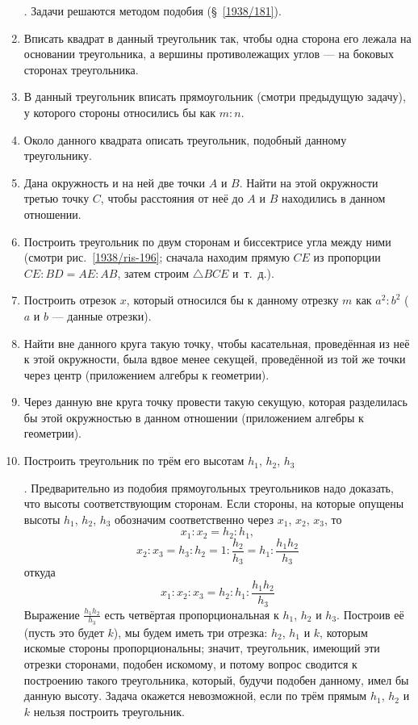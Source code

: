 \documentclass[oneside]{book}
\begin{document}
\begin{enumerate}[resume]
\smallskip
{}.
Задачи решаются методом подобия (§~\ref{1938/181}).

 \item
Вписать квадрат в данный треугольник так, чтобы одна сторона его лежала на основании треугольника, а вершины противолежащих углов — на боковых сторонах треугольника.

 \item
В данный треугольник вписать прямоугольник (смотри предыдущую задачу), у которого стороны относились бы как $m:n$.

 \item
Около данного квадрата описать треугольник, подобный данному треугольнику.

 \item
Дана окружность и на ней две точки $A$ и $B$.
Найти на этой окружности третью точку $C$, чтобы расстояния от неё до $A$ и $B$ находились в данном отношении.

 \item
Построить треугольник по двум сторонам и биссектрисе угла между ними (смотри рис.~\ref{1938/ris-196};
сначала находим прямую $CE$ из пропорции $CE:BD=AE:AB$, затем строим $\triangle BCE$ и~т.~д.).

 \item
Построить отрезок $x$, который относился бы к данному отрезку $m$ как $a^2:b^2$ ($a$ и $b$ — данные отрезки).

 \item
Найти вне данного круга такую точку, чтобы касательная, проведённая из неё к этой окружности, была вдвое менее секущей, проведённой из той же точки через центр (приложением алгебры к геометрии).

 \item
Через данную вне круга точку провести такую секущую, которая разделилась бы этой окружностью в данном отношении (приложением алгебры к геометрии).

 \item
Построить треугольник по трём его высотам $h_1$, $h_2$, $h_3$

\smallskip
{}.
Предварительно из подобия прямоугольных треугольников надо доказать, что высоты  соответствующим сторонам.
Если стороны, на которые опущены высоты $h_1$, $h_2$, $h_3$ обозначим соответственно через $x_1$, $x_2$, $x_3$, то
\[x_1:x_2=h_2:h_1,\]
\[x_2:x_3=h_3:h_2=1:\frac{h_2}{h_3}=h_1:\frac{h_1h_2}{h_3}\]
откуда 
\[x_1:x_2:x_3=h_2:h_1:\frac{h_1h_2}{h_3}\]
Выражение $\frac{h_1h_2}{h_3}$ есть четвёртая пропорциональная к $h_1$, $h_2$ и $h_3$.
Построив её (пусть это будет $k$), мы будем иметь три отрезка:
$h_2$, $h_1$ и $k$, которым искомые стороны пропорциональны;
значит, треугольник, имеющий эти отрезки сторонами, подобен искомому, и потому вопрос сводится к построению такого треугольника, который, будучи подобен данному, имел бы данную высоту.
Задача окажется невозможной, если по трём прямым $h_1$, $h_2$ и $k$ нельзя построить треугольник.


\end{enumerate}
\end{document}
